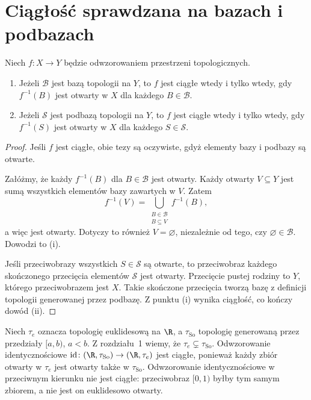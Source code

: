 \section{Ciągłość sprawdzana na bazach i podbazach}
\label{sec:topog-ciaglosc-bazy}

\begin{twierdzenie}
\label{thm:topog-ciaglosc-bazy-podbazy}
Niech $f\colon X\to Y$ będzie odwzorowaniem przestrzeni
topologicznych.
\begin{enumerate}[label=(\roman*)]
\item Jeżeli $\mathcal B$ jest bazą topologii na $Y$,
      to $f$ jest ciągłe wtedy i tylko wtedy, gdy
      $f^{-1}(B)$ jest otwarty w $X$ dla każdego
      $B\in\mathcal B$.
\item Jeżeli $\mathcal S$ jest podbazą topologii na $Y$,
      to $f$ jest ciągłe wtedy i tylko wtedy, gdy
      $f^{-1}(S)$ jest otwarty w $X$ dla każdego
      $S\in\mathcal S$.
\end{enumerate}
\end{twierdzenie}
\begin{proof}
Jeśli $f$ jest ciągłe, obie tezy są oczywiste,
gdyż elementy bazy i podbazy są otwarte.

Załóżmy, że każdy $f^{-1}(B)$ dla $B\in\mathcal B$
jest otwarty. Każdy otwarty $V\subseteq Y$ jest sumą
wszystkich elementów bazy zawartych w $V$. Zatem
\[
f^{-1}(V)=\bigcup_{\substack{B\in\mathcal B\\B\subseteq V}}
 f^{-1}(B),
\]
a więc jest otwarty. Dotyczy to również $V=\varnothing$,
niezależnie od tego, czy $\varnothing\in\mathcal B$.
Dowodzi to (i).

Jeśli przeciwobrazy wszystkich $S\in\mathcal S$
są otwarte, to przeciwobraz każdego skończonego
przecięcia elementów $\mathcal S$ jest otwarty.
Przecięcie pustej rodziny to $Y$, którego przeciwobrazem
jest $X$. Takie skończone przecięcia tworzą bazę
z definicji topologii generowanej przez podbazę.
Z punktu (i) wynika ciągłość, co kończy dowód (ii).
\end{proof}

\begin{przyklad}
\label{ex:topog-ciaglosc-sorgenfrey}
Niech $\tau_e$ oznacza topologię euklidesową na $\R$,
a $\tau_{\mathrm{So}}$ topologię generowaną przez
przedziały $[a,b)$, $a<b$. Z rozdziału~1 wiemy, że
$\tau_e\subsetneq\tau_{\mathrm{So}}$.
Odwzorowanie identycznościowe
$\operatorname{id}\colon(\R,\tau_{\mathrm{So}})
\to(\R,\tau_e)$ jest ciągłe, ponieważ każdy zbiór
otwarty w $\tau_e$ jest otwarty także w $\tau_{\mathrm{So}}$.
Odwzorowanie identycznościowe w przeciwnym kierunku
nie jest ciągłe: przeciwobraz $[0,1)$ byłby tym samym
zbiorem, a nie jest on euklidesowo otwarty.
\end{przyklad}

